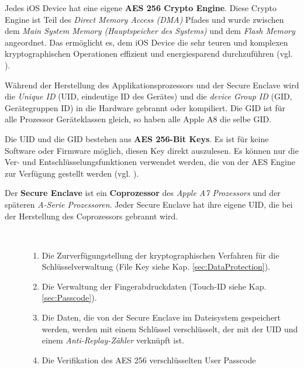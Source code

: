 Jedes iOS Device hat eine eigene \textbf{AES 256 Crypto Engine}. Diese Crypto Engine ist Teil des \textit{\glqq Direct Memory Access (DMA)\grqq{}} Pfades und wurde zwischen dem \textit{\glqq Main System Memory (Hauptspeicher des Systems)\grqq{}} und dem \textit{\glqq Flash Memory\grqq{}} angeordnet. Das ermöglicht es, dem iOS Device die sehr teuren und komplexen kryptographischen Operationen effizient und energiesparend durchzuführen (vgl. \cite{iOSSec[5], iOSSec[2],iOSSec[1], Apple[4], Apple[5], Apple[6], Apple[3]}). \par 
Während der Herstellung des Applikationsprozessors und der Secure Enclave wird die \textit{\glqq Unique ID\grqq{}} (UID, eindeutige ID des Gerätes) und die \textit{\glqq device Group ID\grqq{}} (GID, Gerätegruppen ID) in die Hardware gebrannt oder kompiliert. Die GID ist für alle Prozessor Geräteklassen gleich, so haben alle Apple A8 die selbe GID. \par 
Die UID und die GID bestehen aus \textbf{AES 256-Bit Keys}. Es ist für keine Software oder Firmware möglich, diesen Key direkt auszulesen. Es können nur die Ver- und Entschlüsselungsfunktionen verwendet werden, die von der AES Engine zur Verfügung gestellt werden (vgl. \cite{iOSSec[5], iOSSec[2],iOSSec[1], Apple[4], Apple[5], Apple[6], Apple[3]}).

Der \textbf{Secure Enclave} ist ein \textbf{Coprozessor} des \textit{\glqq Apple A7 Prozessors\grqq{}} und der späteren \textit{\glqq A-Serie Prozessoren\grqq}. Jeder Secure Enclave hat ihre eigene UID, die bei der Herstellung des Coprozessors gebrannt wird.

\begin{description}
     \item[\parbox{\textwidth} {Die Secure Enclave hat folgende Aufgaben}]~\par
    \begin{enumerate}
        \item Die Zurverfügungstellung der kryptographischen Verfahren für die Schlüsselverwaltung (File Key siehe Kap. \ref{sec:DataProtection}).
       \item Die Verwaltung der Fingerabdruckdaten (Touch-ID siehe Kap. \ref{sec:Passcode}).
       \item Die Daten, die von der Secure Enclave im Dateisystem gespeichert werden, werden mit einem Schlüssel verschlüsselt, der mit der UID und einem \textit{\glqq Anti-Replay-Zähler\grqq{}} verknüpft ist.
       \item Die Verifikation des AES 256 verschlüsselten User Passcode
    \end{enumerate}   
\end{description} 

